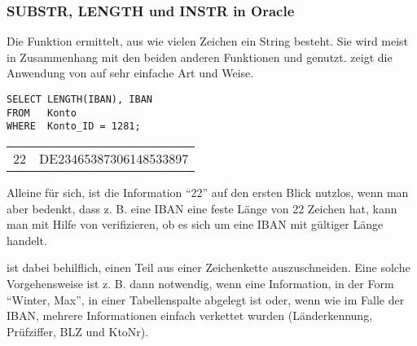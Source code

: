         \subsubsection{SUBSTR, LENGTH und INSTR in Oracle}
          Die Funktion  ermittelt, aus wie vielen Zeichen
          ein String besteht. Sie wird meist in Zusammenhang mit den beiden
          anderen Funktionen  und 
          genutzt.  zeigt die Anwendung von
           auf sehr einfache Art und Weise.
          \begin{lstlisting}[language=oracle_sql,caption={Die \languageorasql{LENGTH}-Funktion},label=sql03_04]
SELECT LENGTH(IBAN), IBAN
FROM   Konto
WHERE  Konto_ID = 1281;
          \end{lstlisting}
          \begin{center}
            \begin{small}
              \tablehead{}
              \tabletail {
              }
              \begin{oraclesql}
                \begin{supertabular}{rl}
                  22 & DE23465387306148533897 \\
                \end{supertabular}
              \end{oraclesql}
            \end{small}
          \end{center}
          Alleine für sich, ist die Information \enquote{22} auf den ersten Blick nutzlos, wenn man aber bedenkt, dass z. B. eine IBAN eine feste Länge von 22 Zeichen hat, kann man mit Hilfe von  verifizieren, ob es sich um eine IBAN mit
          gültiger Länge handelt.

           ist dabei behilflich, einen Teil aus einer Zeichenkette auszuschneiden. Eine solche Vorgehensweise ist z. B. dann notwendig, wenn eine Information, in der Form \enquote{Winter, Max}, in einer Tabellenspalte abgelegt ist oder, wenn wie im Falle der IBAN, mehrere Informationen einfach verkettet wurden (Länderkennung, Prüfziffer, BLZ und KtoNr).

